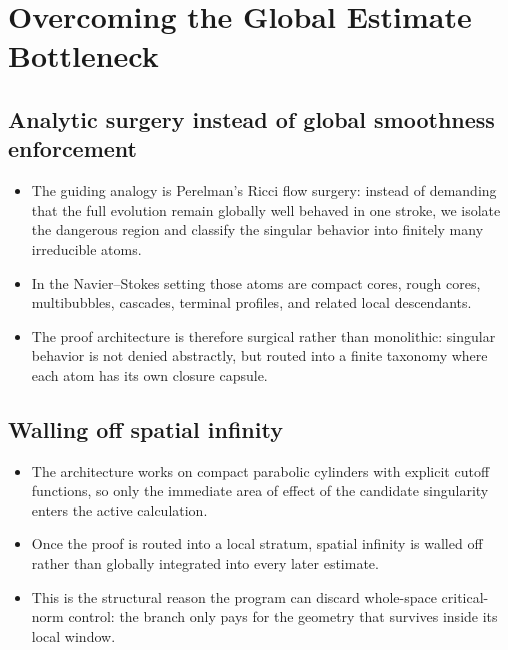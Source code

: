 \documentclass[11pt]{article}
\theoremstyle{plain}
\theoremstyle{definition}
\theoremstyle{remark}
\newcommand{\NS}{Navier--Stokes}
\begin{document}
\section{Overcoming the Global Estimate Bottleneck}
\label{sec:global-bottleneck}

\subsection{Analytic surgery instead of global smoothness enforcement}
\begin{itemize}
  \item The guiding analogy is Perelman's Ricci flow surgery: instead of demanding that the full evolution remain globally well behaved in one stroke, we isolate the dangerous region and classify the singular behavior into finitely many irreducible atoms.
  \item In the \NS{} setting those atoms are compact cores, rough cores, multibubbles, cascades, terminal profiles, and related local descendants.
  \item The proof architecture is therefore surgical rather than monolithic: singular behavior is not denied abstractly, but routed into a finite taxonomy where each atom has its own closure capsule.
\end{itemize}

\subsection{Walling off spatial infinity}
\begin{itemize}
  \item The architecture works on compact parabolic cylinders with explicit cutoff functions, so only the immediate area of effect of the candidate singularity enters the active calculation.
  \item Once the proof is routed into a local stratum, spatial infinity is walled off rather than globally integrated into every later estimate.
  \item This is the structural reason the program can discard whole-space critical-norm control: the branch only pays for the geometry that survives inside its local window.
\end{itemize}
\end{document}
